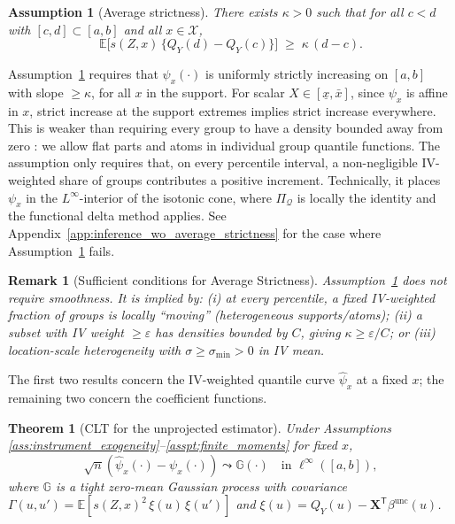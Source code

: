 \documentclass[12pt]{article}
\newcommand{\E}{\mathbb{E}}
\newcommand{\T}{\mathsf{T}} %
\newcommand{\xbar}{\underline{x}}
\newcommand{\xbaru}{\bar{x}}
\newtheorem{theorem}{Theorem}
\newtheorem{assumption}{Assumption}
\newtheorem{remark}{Remark}
\begin{document}
\begin{assumption}[Average strictness] \label{asspt:average_strictness}
There exists $\kappa>0$ such that for all $c<d$ with $[c,d]\subset [a,b]$ and all $x \in \mathcal{X}$,
\[
\E\!\Big[s(Z,x)\,\big\{Q_Y(d)-Q_Y(c)\big\}\Big]\;\ge\;\kappa\,(d-c).
\]
\end{assumption}

Assumption~\ref{asspt:average_strictness} requires that $\psi_x(\cdot)$ is uniformly strictly increasing on $[a,b]$ with slope $\geq \kappa$, for all $x$ in the support. For scalar $X \in [\xbar, \xbaru]$, since $\psi_x$ is affine in $x$, strict increase at the support extremes implies strict increase everywhere. This is weaker than requiring every group to have a density bounded away from zero \citep{chetverikov2016iv}: we allow flat parts and atoms in individual group quantile functions. The assumption only requires that, on every percentile interval, a non-negligible IV-weighted share of groups contributes a positive increment. Technically, it places $\psi_x$ in the $L^\infty$-interior of the isotonic cone, where $\Pi_{\mathcal{Q}}$ is locally the identity and the functional delta method applies. See Appendix~\ref{app:inference_wo_average_strictness} for the case where Assumption~\ref{asspt:average_strictness} fails.

\begin{remark}[Sufficient conditions for Average Strictness] \label{rem:smoothness}
Assumption~\ref{asspt:average_strictness} does not require smoothness. It is implied by: (i) at every percentile, a fixed IV-weighted fraction of groups is locally ``moving'' (heterogeneous supports/atoms); (ii) a subset with IV weight $\geq \varepsilon$ has densities bounded by $C$, giving $\kappa \geq \varepsilon/C$; or (iii) location-scale heterogeneity with $\sigma \geq \sigma_{\min} > 0$ in IV mean.
\end{remark}

The first two results concern the IV-weighted quantile curve $\hat{\psi}_x$ at a fixed $x$; the remaining two concern the coefficient functions.

\begin{theorem}[CLT for the unprojected estimator] \label{thm:convergence_unprojected}
Under Assumptions \ref{ass:instrument_exogeneity}--\ref{asspt:finite_moments} for fixed $x$,
\[
\sqrt{n} \left( \hat{\psi}_x(\cdot) - \psi_x(\cdot) \right) \leadsto \mathbb{G}(\cdot) \quad \text{in } \ell^\infty([a,b]),
\]
where $\mathbb{G}$ is a tight zero-mean Gaussian process with covariance $\Gamma(u,u') = \E[s(Z,x)^2\, \xi(u)\,\xi(u')]$ and $\xi(u) = Q_Y(u) - \mathbf{X}^{\!\T} \beta^{\text{unc}}(u)$.
\end{theorem}
\end{document}

